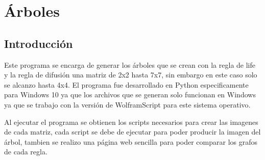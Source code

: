 \section{Árboles}
\subsection{Introducción}
Este programa se encarga de generar los árboles que se crean con la regla de life y la regla de difusión una matriz de 2x2 hasta 7x7, sin embargo en este caso solo se alcanzo hasta 4x4. El programa fue desarrollado en Python especificamente para Windows 10 ya que los archivos que se generan solo funcionan en Windows ya que se trabajo con la versión de WolframScript para este sistema operativo.

Al ejecutar el programa se obtienen los scripts necesarios para crear las imagenes de cada matriz, cada script se debe de ejecutar para poder producir la imagen del árbol, tambien se realizo una página web sencilla para poder comparar los grafos de cada regla.
